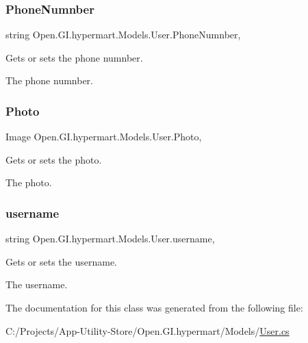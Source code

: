 \subsubsection{\texorpdfstring{Phone\+Numnber}{PhoneNumnber}}
{\footnotesize\ttfamily string Open.\+G\+I.\+hypermart.\+Models.\+User.\+Phone\+Numnber\hspace{0.3cm}{\ttfamily [get]}, {\ttfamily [set]}}



Gets or sets the phone numnber. 

The phone numnber. \hypertarget{class_open_1_1_g_i_1_1hypermart_1_1_models_1_1_user_ae5b46912f2c2765d720a0a4754cc1921}{}\label{class_open_1_1_g_i_1_1hypermart_1_1_models_1_1_user_ae5b46912f2c2765d720a0a4754cc1921} 
\subsubsection{\texorpdfstring{Photo}{Photo}}
{\footnotesize\ttfamily Image Open.\+G\+I.\+hypermart.\+Models.\+User.\+Photo\hspace{0.3cm}{\ttfamily [get]}, {\ttfamily [set]}}



Gets or sets the photo. 

The photo. \hypertarget{class_open_1_1_g_i_1_1hypermart_1_1_models_1_1_user_a8681bb284b2bce5e87537a5dedc2dc05}{}\label{class_open_1_1_g_i_1_1hypermart_1_1_models_1_1_user_a8681bb284b2bce5e87537a5dedc2dc05} 
\subsubsection{\texorpdfstring{username}{username}}
{\footnotesize\ttfamily string Open.\+G\+I.\+hypermart.\+Models.\+User.\+username\hspace{0.3cm}{\ttfamily [get]}, {\ttfamily [set]}}



Gets or sets the username. 

The username. 

The documentation for this class was generated from the following file\+:\begin{DoxyCompactItemize}
\item 
C\+:/\+Projects/\+App-\/\+Utility-\/\+Store/\+Open.\+G\+I.\+hypermart/\+Models/\hyperlink{_models_2_user_8cs}{User.\+cs}\end{DoxyCompactItemize}
